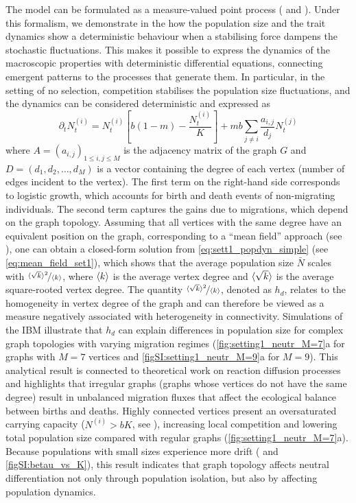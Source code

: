 The model can be formulated as a measure-valued point process (\cite{Bansaye2015} and ). Under this formalism, we demonstrate in the  how the population size and the trait dynamics show a deterministic behaviour when a stabilising force dampens the stochastic fluctuations. This makes it possible to express the dynamics of the macroscopic properties with deterministic differential equations, connecting emergent patterns to the processes that generate them. In particular, in the setting of no selection, competition stabilises the population size fluctuations, and the dynamics can be considered deterministic and expressed as
%
\begin{equation}\label{eq:sett1_popdyn_simple}
  \partial_t N_t^{(i)} = N_t^{(i)} \left[ b(1-m) - \frac{N_t^{(i)}}{K} \right] + m b \sum_{j\neq i}\frac{a_{i,j}}{d_j} N_t^{(j)}
\end{equation}
%
where $A = (a_{i,j})_{1\leq i, j \leq M}$ is the adjacency matrix of the graph $G$ and $D = (d_1,d_2,\dots,d_M)$ is a vector containing the degree of each vertex (number of edges incident to the vertex).
%
The first term on the right-hand side corresponds to logistic growth, which accounts for birth and death events of non-migrating individuals. The second term captures the gains due to migrations, which depend on the graph topology. 
%
Assuming that all vertices with the same degree have an equivalent position on the graph, corresponding to a “mean field” approach (see ), one can obtain a closed-form solution from \cref{eq:sett1_popdyn_simple} (see \cref{eq:mean_field_set1}), which shows that the average population size $\bar{N}$ scales with $\nicefrac{\langle \sqrt{k} \rangle^2}{\langle k \rangle}$, where $\langle k \rangle$ is the average vertex degree and $\langle \sqrt{k} \rangle$ is the average square-rooted vertex degree. 
%
The quantity $\nicefrac{\langle \sqrt{k} \rangle^2}{\langle k \rangle}$, denoted as $h_d$, relates to the homogeneity in vertex degree of the graph and can therefore be viewed as a measure negatively associated with heterogeneity in connectivity. Simulations of the IBM illustrate that $h_d$ can explain differences in population size for complex graph topologies with varying migration regimes (\cref{fig:setting1_neutr_M=7}a for graphs with $M=7$ vertices and \cref{figSI:setting1_neutr_M=9}a for $M=9$). 
%
This analytical result is connected to theoretical work on reaction diffusion processes \cite{Colizza2007} and highlights that irregular graphs (graphs whose vertices do not have the same degree) result in unbalanced migration fluxes that affect the ecological balance between births and deaths. Highly connected vertices present an oversaturated carrying capacity ($N^{(i)} > bK$, see ), increasing local competition and lowering total population size compared with regular graphs (\cref{fig:setting1_neutr_M=7}a).
%
Because populations with small sizes experience more drift (\cite{Burger2000} and \cref{figSI:betau_vs_K}), this result indicates that graph topology affects neutral differentiation not only through population isolation, but also by affecting population dynamics.


